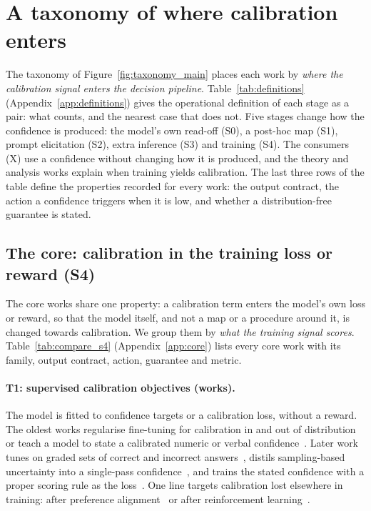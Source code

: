\section{A taxonomy of where calibration enters}
\label{sec:taxonomy}

The taxonomy of Figure~\ref{fig:taxonomy_main} places each work by \emph{where the calibration signal
enters the decision pipeline}. Table~\ref{tab:definitions} (Appendix~\ref{app:definitions}) gives the operational definition of each
stage as a pair: what counts, and the nearest case that does not. Five stages change how the confidence
is produced: the model's own read-off (S0), a post-hoc map (S1), prompt elicitation (S2), extra
inference (S3) and training (S4). The consumers (X) use a confidence without changing how it is
produced, and the theory and analysis works explain when training yields calibration. The last three
rows of the table define the properties recorded for every work: the output contract, the action a
confidence triggers when it is low, and whether a distribution-free guarantee is stated.


\subsection{The core: calibration in the training loss or reward (S4)}
\label{sec:core}

The \nCore core works share one property: a calibration term enters the model's own loss or reward, so
that the model itself, and not a map or a procedure around it, is changed towards calibration. We group
them by \emph{what the training signal scores}. Table~\ref{tab:compare_s4} (Appendix~\ref{app:core}) lists every core work with
its family, output contract, action, guarantee and metric.


\paragraph{T1: supervised calibration objectives (\nTOne works).} The model is fitted to confidence
targets or a calibration loss, without a reward. The oldest works regularise fine-tuning for calibration
in and out of distribution~\citep{kong2020calibrated} or teach a model to state a calibrated numeric or
verbal confidence~\citep{lin2022teaching}. Later work tunes on graded sets of correct and incorrect
answers~\citep{kapoor2024large}, distils sampling-based uncertainty into a single-pass
confidence~\citep{hager2025uncertainty,huang2025efficient}, and trains the stated confidence with a
proper scoring rule as the loss~\citep{li2025conftuner}. One line targets calibration lost elsewhere in
training: after preference alignment~\citep{xiao2025restoring} or after reinforcement
learning~\citep{xiaohu2026know}.

